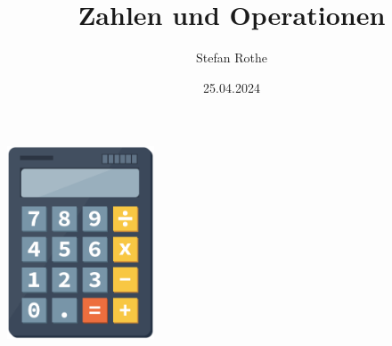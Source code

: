 \documentclass[parskip=half]{scrartcl}
\title{Zahlen und Operationen}
\author{Stefan Rothe}
\date{25.04.2024}
\begin{document}
  \maketitle
  \thispagestyle{empty}
  \begin{center}
    \includegraphics[height=5.7cm]{calculator.pdf}
  \end{center}
  \tableofcontents
  \clearpage
  ~
  \thispagestyle{empty}
  \clearpage

  
  
  
  
  
  
  
  
  
  
  
  
  
  
  
%  
\end{document}
